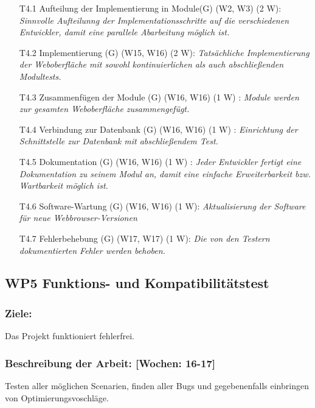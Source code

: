 \documentclass{report}
\begin{document}
\begin{enumerate}
\item [T4.1] Aufteilung der Implementierung in Module(G) (W2, W3) (2 W): \emph{ Sinnvolle Aufteilunng der Implementationsschritte auf die verschiedenen Entwickler, damit eine parallele Abarbeitung möglich ist.}
\item [T4.2] Implementierung (G) (W15, W16) (2 W): \emph{ Tatsächliche Implementierung der Weboberfläche mit sowohl kontinuierlichen als auch abschließenden Modultests.}
\item [T4.3] Zusammenfügen der Module (G) (W16, W16) (1 W) : \emph{ Module werden zur gesamten Weboberfläche zusammengefügt.}
\item [T4.4] Verbindung zur Datenbank (G) (W16, W16) (1 W) : \emph{ Einrichtung der Schnittstelle zur Datenbank mit abschließendem Test.}
\item [T4.5] Dokumentation (G) (W16, W16) (1 W) : \emph{ Jeder Entwickler fertigt eine Dokumentation zu seinem Modul an, damit eine einfache Erweiterbarkeit bzw. Wartbarkeit möglich ist.}
\item [T4.6] Software-Wartung (G) (W16, W16) (1 W): \emph{ Aktualisierung der Software für neue Webbrowser-Versionen}
\item [T4.7] Fehlerbehebung (G) (W17, W17) (1 W): \emph{Die von den Testern dokumentierten Fehler werden behoben.}

\end{enumerate}

\subsection*{WP5 Funktions- und Kompatibilitätstest}

\subsubsection{Ziele:} Das Projekt funktioniert fehlerfrei.
\subsubsection{Beschreibung der Arbeit: [Wochen: 16-17]} Testen aller möglichen Scenarien, finden aller Bugs und gegebenenfalls einbringen von Optimierungsvoschläge.
\end{document}
